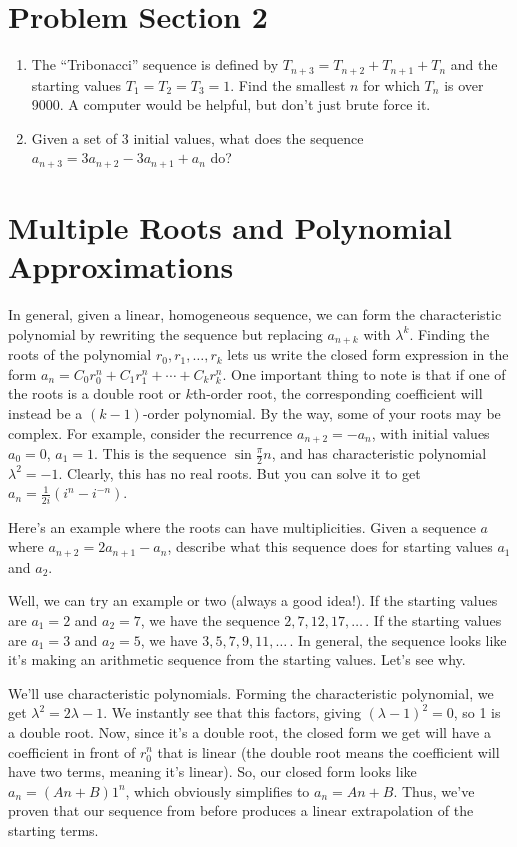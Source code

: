 \documentclass[12pt,letterpaper]{article}
\begin{document}
\section{Problem Section 2}
\begin{enumerate}
  \item The ``Tribonacci'' sequence is defined by $T_{n+3} = T_{n+2} + T_{n+1}
  + T_n$ and the starting values $T_1 = T_2 = T_3 = 1$. Find the smallest $n$
  for which $T_n$ is over 9000. A computer would be helpful, but don't just
  brute force it.
  \item Given a set of 3 initial values, what does the sequence $a_{n+3} =
  3a_{n+2} - 3a_{n+1} + a_n$ do?
\end{enumerate}

\section{Multiple Roots and Polynomial Approximations}
In general, given a linear, homogeneous sequence, we can form the
characteristic polynomial by rewriting the sequence but replacing
$a_{n+k}$ with $\lambda^k$. Finding the roots of the polynomial
$r_0, r_1, \ldots, r_k$ lets us write the closed form expression in the
form $a_n = C_0 r_0^n + C_1 r_1^n + \cdots + C_k r_k^n$. One important
thing to note is that if one of the roots is a double root or
$k$th-order root, the corresponding coefficient will instead be a $(k-1)$-order
polynomial. By the way, some of your roots may be complex. For example, consider
the recurrence $a_{n+2} = -a_n$, with initial values $a_0 = 0$, $a_1 = 1$. This
is the sequence $\sin \frac{\pi}{2} n$, and has characteristic polynomial
$\lambda^2 = -1$. Clearly, this has no real roots. But you can solve it to get
$a_n = \frac{1}{2i}(i^n - i^{-n})$.

Here's an example where the roots can have multiplicities. Given a
sequence $a$ where $a_{n+2} = 2a_{n+1} - a_n$, describe what
this sequence does for starting values $a_1$ and $a_2$.

Well, we can try an example or two (always a good idea!). If the starting
values are $a_1 = 2$ and $a_2 = 7$, we have the sequence $2, 7, 12, 17, \ldots\,$.
If the starting values are $a_1 = 3$ and $a_2 = 5$, we have $3, 5, 7, 9, 11, \ldots\,$.
In general, the sequence looks like it's making an arithmetic sequence from
the starting values. Let's see why.

We'll use characteristic polynomials. Forming the characteristic polynomial,
we get $\lambda^2 = 2\lambda - 1$. We instantly see that this factors, giving
$(\lambda - 1)^2 = 0$, so 1 is a double root. Now, since it's a double root,
the closed form we get will have a coefficient in front of $r_0^n$ that is
linear (the double root means the coefficient will have two terms, meaning it's linear).
So, our closed form looks like $a_n = (An + B)1^n$, which obviously simplifies to $a_n = An+B$.
Thus, we've proven that our sequence from before produces a linear extrapolation
of the starting terms.
\end{document}
